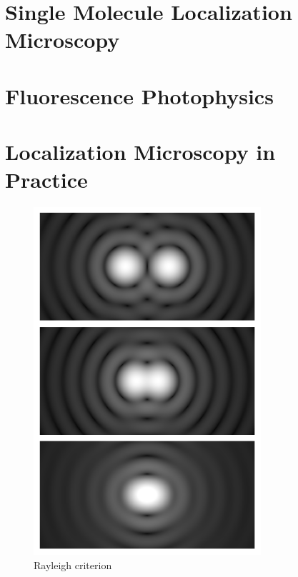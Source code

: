 \documentclass[10pt,a4paper]{book}
\begin{document}
\chapter{Single Molecule Localization Microscopy}

\chapter{Fluorescence Photophysics}

\chapter{Localization Microscopy in Practice}

\begin{figure}[ht]
    \centering
    \includegraphics[width=0.75\textwidth]{Airy_disk_spacing_near_Rayleigh_criterion.png}
    \caption{Rayleigh criterion}
    \label{fig:rayleigh}
\end{figure}
\end{document}
